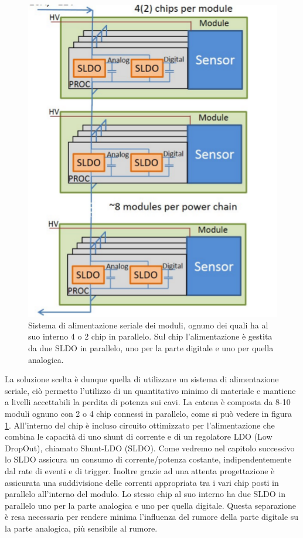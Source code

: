 \begin{figure}
\centering
\includegraphics[scale=0.4]{Immagini/serial}
\caption{Sistema di alimentazione seriale dei moduli, ognuno dei quali ha al suo interno 4 o 2 chip in parallelo. Sul chip l'alimentazione è gestita da due SLDO in parallelo, uno per la parte digitale e uno per quella analogica.}
\label{serial}
\end{figure}

La soluzione scelta è dunque quella di utilizzare un sistema di alimentazione seriale, ciò permetto l'utilizzo di un quantitativo minimo di materiale e mantiene a livelli accettabili la perdita di potenza sui cavi. 
La catena è composta da 8-10 moduli ognuno con 2 o 4 chip connessi in parallelo, come si può vedere in figura \ref{serial}. 
All'interno del chip è incluso circuito ottimizzato per l'alimentazione che combina le capacità di uno shunt di corrente e di un regolatore LDO (Low DropOut), chiamato Shunt-LDO (SLDO). 
Come vedremo nel capitolo successivo lo SLDO assicura un consumo di corrente/potenza costante, indipendentemente dal rate di eventi e di trigger. 
Inoltre grazie ad una attenta progettazione è assicurata una suddivisione delle correnti appropriata tra i vari chip posti in parallelo all'interno del modulo. Lo stesso chip al suo interno ha due SLDO in parallelo uno per la parte analogica e uno per quella digitale. 
Questa separazione è resa necessaria per rendere minima l'influenza del rumore della parte digitale su la parte analogica, più sensibile  al rumore.